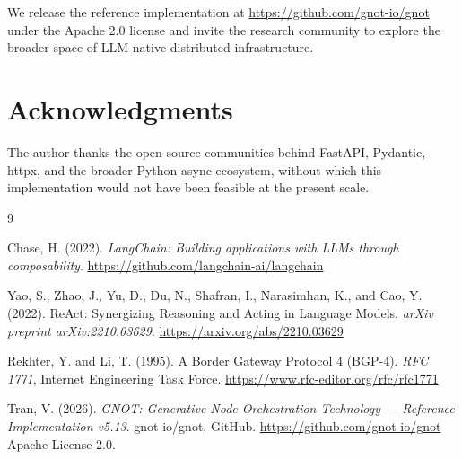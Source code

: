 \documentclass[10pt,twocolumn]{article}
\begin{document}
We release the reference implementation at
\url{https://github.com/gnot-io/gnot}~\cite{gnot2026} under the Apache
2.0 license and invite the research community to explore the broader
space of LLM-native distributed infrastructure.

\section*{Acknowledgments}

The author thanks the open-source communities behind FastAPI, Pydantic,
httpx, and the broader Python async ecosystem, without which this
implementation would not have been feasible at the present scale.

\begin{thebibliography}{9}

  Chase, H. (2022).
  \textit{LangChain: Building applications with LLMs through composability}.
  \url{https://github.com/langchain-ai/langchain}

  Yao, S., Zhao, J., Yu, D., Du, N., Shafran, I., Narasimhan, K., and
  Cao, Y. (2022).
  ReAct: Synergizing Reasoning and Acting in Language Models.
  \textit{arXiv preprint arXiv:2210.03629}.
  \url{https://arxiv.org/abs/2210.03629}

  Rekhter, Y. and Li, T. (1995).
  A Border Gateway Protocol 4 (BGP-4).
  \textit{RFC 1771}, Internet Engineering Task Force.
  \url{https://www.rfc-editor.org/rfc/rfc1771}

  Tran, V. (2026).
  \textit{GNOT: Generative Node Orchestration Technology --- Reference
  Implementation v5.13}.
  gnot-io/gnot, GitHub.
  \url{https://github.com/gnot-io/gnot}
  Apache License 2.0.

\end{thebibliography}
\end{document}
